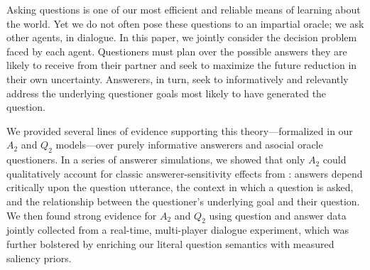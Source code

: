 \documentclass[12pt, floatsintext, jou]{apa6}
\begin{document}
Asking questions is one of our most efficient and reliable means of learning about the world. Yet we do not often pose these questions to an impartial oracle; we ask other agents, in dialogue. In this paper, we jointly consider the decision problem faced by each agent. Questioners must plan over the possible answers they are likely to receive from their partner and seek to maximize the future reduction in their own uncertainty. Answerers, in turn, seek to informatively and relevantly address the underlying questioner goals most likely to have generated the question. 

We provided several lines of evidence supporting this theory---formalized in our $A_2$ and $Q_2$ models---over purely informative answerers and asocial oracle questioners. In a series of answerer simulations, we showed that only $A_2$ could qualitatively account for classic answerer-sensitivity effects from : answers depend critically upon the question utterance, the context in which a question is asked, and the relationship between the questioner's underlying goal and their question. We then found strong evidence for $A_2$ and $Q_2$ using question and answer data jointly collected from a real-time, multi-player dialogue experiment, which was further bolstered by enriching our literal question semantics with measured saliency priors. %

\end{document}
